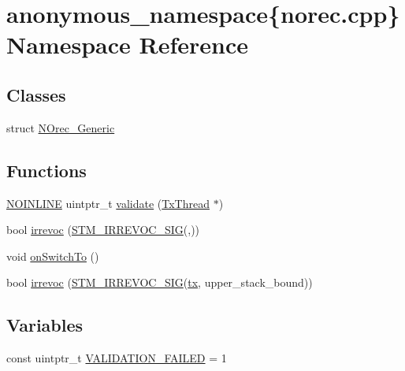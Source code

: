 \hypertarget{namespaceanonymous__namespace_02norec_8cpp_03}{\section{anonymous\-\_\-namespace\{norec.\-cpp\} Namespace Reference}
\label{namespaceanonymous__namespace_02norec_8cpp_03}
}
\subsection*{Classes}
\begin{DoxyCompactItemize}
\item 
struct \hyperlink{structanonymous__namespace_02norec_8cpp_03_1_1NOrec__Generic}{N\-Orec\-\_\-\-Generic}
\end{DoxyCompactItemize}
\subsection*{Functions}
\begin{DoxyCompactItemize}
\item 
\hyperlink{platform_8hpp_a1b173d22e57d9395897acbd8de62d505}{N\-O\-I\-N\-L\-I\-N\-E} uintptr\-\_\-t \hyperlink{namespaceanonymous__namespace_02norec_8cpp_03_aee95b2525a8da3a37e412cee0724967c}{validate} (\hyperlink{structstm_1_1TxThread}{Tx\-Thread} $\ast$)
\item 
bool \hyperlink{namespaceanonymous__namespace_02norec_8cpp_03_a0a6ec6794c0677e7f91daf5cb3a57775}{irrevoc} (\hyperlink{include_2stm_2macros_8hpp_acf117c2df6442342f6603e1a12fa3b5c}{S\-T\-M\-\_\-\-I\-R\-R\-E\-V\-O\-C\-\_\-\-S\-I\-G}(,))
\item 
void \hyperlink{namespaceanonymous__namespace_02norec_8cpp_03_a964889786277f55bf219ecf6a8fbd4a1}{on\-Switch\-To} ()
\item 
bool \hyperlink{namespaceanonymous__namespace_02norec_8cpp_03_af8d688b5b5c223deffce84766ea687ca}{irrevoc} (\hyperlink{include_2stm_2macros_8hpp_acf117c2df6442342f6603e1a12fa3b5c}{S\-T\-M\-\_\-\-I\-R\-R\-E\-V\-O\-C\-\_\-\-S\-I\-G}(\hyperlink{stmskip_8cc_a0f1c58699b83ce5a08bd9ee859250d72}{tx}, upper\-\_\-stack\-\_\-bound))
\end{DoxyCompactItemize}
\subsection*{Variables}
\begin{DoxyCompactItemize}
\item 
const uintptr\-\_\-t \hyperlink{namespaceanonymous__namespace_02norec_8cpp_03_a9f9326929879517472fe0cdccf616ffb}{V\-A\-L\-I\-D\-A\-T\-I\-O\-N\-\_\-\-F\-A\-I\-L\-E\-D} = 1
\end{DoxyCompactItemize}


